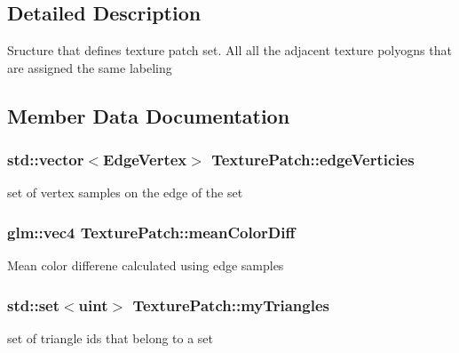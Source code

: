 \subsection{Detailed Description}
Sructure that defines texture patch set. All all the adjacent texture polyogns that are assigned the same labeling 

\subsection{Member Data Documentation}
\hypertarget{struct_texture_patch_a93366f5b9cc0d02ba08ffb4fba64d977}{}
\subsubsection[{edge\+Verticies}]{\setlength{\rightskip}{0pt plus 5cm}std\+::vector$<${\bf Edge\+Vertex}$>$ Texture\+Patch\+::edge\+Verticies}\label{struct_texture_patch_a93366f5b9cc0d02ba08ffb4fba64d977}
set of vertex samples on the edge of the set \hypertarget{struct_texture_patch_a1285c94f40ae56464f33eaf69fb93617}{}
\subsubsection[{mean\+Color\+Diff}]{\setlength{\rightskip}{0pt plus 5cm}glm\+::vec4 Texture\+Patch\+::mean\+Color\+Diff}\label{struct_texture_patch_a1285c94f40ae56464f33eaf69fb93617}
Mean color differene calculated using edge samples \hypertarget{struct_texture_patch_a6508eab52b765ffa3f5b185956334f47}{}
\subsubsection[{my\+Triangles}]{\setlength{\rightskip}{0pt plus 5cm}std\+::set$<$uint$>$ Texture\+Patch\+::my\+Triangles}\label{struct_texture_patch_a6508eab52b765ffa3f5b185956334f47}
set of triangle ids that belong to a set \hypertarget{struct_texture_patch_a002b3455ab2599b42b78c34c1d887f94}{}
